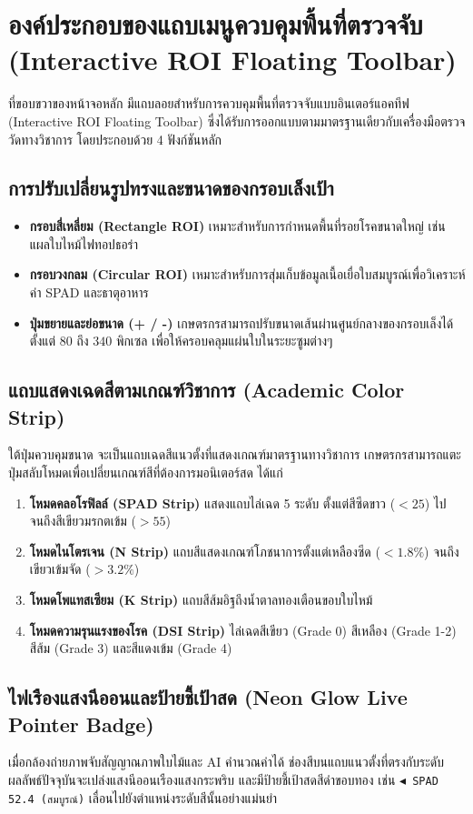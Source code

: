 \section{องค์ประกอบของแถบเมนูควบคุมพื้นที่ตรวจจับ (Interactive ROI Floating Toolbar)}
ที่ขอบขวาของหน้าจอหลัก มีแถบลอยสำหรับการควบคุมพื้นที่ตรวจจับแบบอินเตอร์แอคทีฟ (Interactive ROI Floating Toolbar) ซึ่งได้รับการออกแบบตามมาตรฐานเดียวกับเครื่องมือตรวจวัดทางวิชาการ โดยประกอบด้วย 4 ฟังก์ชันหลัก

\subsection{การปรับเปลี่ยนรูปทรงและขนาดของกรอบเล็งเป้า}
\begin{itemize}
  \item \textbf{กรอบสี่เหลี่ยม (Rectangle ROI)} เหมาะสำหรับการกำหนดพื้นที่รอยโรคขนาดใหญ่ เช่น แผลใบไหม้ไฟทอปธอร่า
  \item \textbf{กรอบวงกลม (Circular ROI)} เหมาะสำหรับการสุ่มเก็บข้อมูลเนื้อเยื่อใบสมบูรณ์เพื่อวิเคราะห์ค่า SPAD และธาตุอาหาร
  \item \textbf{ปุ่มขยายและย่อขนาด (+ / -)} เกษตรกรสามารถปรับขนาดเส้นผ่านศูนย์กลางของกรอบเล็งได้ตั้งแต่ $80$ ถึง $340$ พิกเซล เพื่อให้ครอบคลุมแผ่นใบในระยะซูมต่างๆ
\end{itemize}

\subsection{แถบแสดงเฉดสีตามเกณฑ์วิชาการ (Academic Color Strip)}
ใต้ปุ่มควบคุมขนาด จะเป็นแถบเฉดสีแนวตั้งที่แสดงเกณฑ์มาตรฐานทางวิชาการ เกษตรกรสามารถแตะปุ่มสลับโหมดเพื่อเปลี่ยนเกณฑ์สีที่ต้องการมอนิเตอร์สด ได้แก่
\begin{enumerate}
  \item \textbf{โหมดคลอโรฟิลล์ (SPAD Strip)} แสดงแถบไล่เฉด 5 ระดับ ตั้งแต่สีซีดขาว ($<25$) ไปจนถึงสีเขียวมรกตเข้ม ($>55$)
  \item \textbf{โหมดไนโตรเจน (N Strip)} แถบสีแสดงเกณฑ์โภชนาการตั้งแต่เหลืองซีด ($<1.8\%$) จนถึงเขียวเข้มจัด ($>3.2\%$)
  \item \textbf{โหมดโพแทสเซียม (K Strip)} แถบสีส้มอิฐถึงน้ำตาลทองเตือนขอบใบไหม้
  \item \textbf{โหมดความรุนแรงของโรค (DSI Strip)} ไล่เฉดสีเขียว (Grade 0) สีเหลือง (Grade 1-2) สีส้ม (Grade 3) และสีแดงเข้ม (Grade 4)
\end{enumerate}

\subsection{ไฟเรืองแสงนีออนและป้ายชี้เป้าสด (Neon Glow Live Pointer Badge)}
เมื่อกล้องถ่ายภาพจับสัญญาณภาพใบไม้และ AI คำนวณค่าได้ ช่องสีบนแถบแนวตั้งที่ตรงกับระดับผลลัพธ์ปัจจุบันจะเปล่งแสงนีออนเรืองแสงกระพริบ และมีป้ายชี้เป้าสดสีดำขอบทอง เช่น \texttt{$\blacktriangleleft$ SPAD 52.4 (สมบูรณ์)} เลื่อนไปยังตำแหน่งระดับสีนั้นอย่างแม่นยำ

